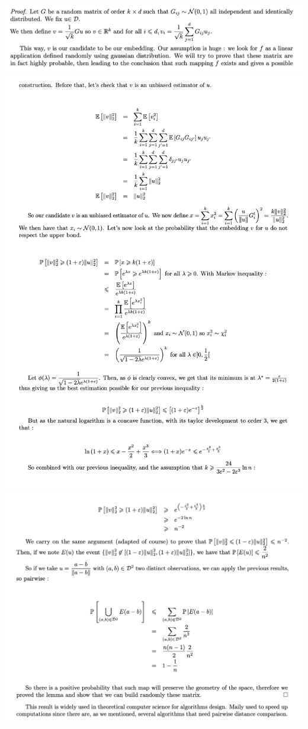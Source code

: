 \includegraphics[width=\linewidth]{./img/reduction_dim/lemme_jl/preuve_1}
\includegraphics[width=\linewidth]{./img/reduction_dim/lemme_jl/preuve_2}
\includegraphics[width=\linewidth]{./img/reduction_dim/lemme_jl/preuve_3}
